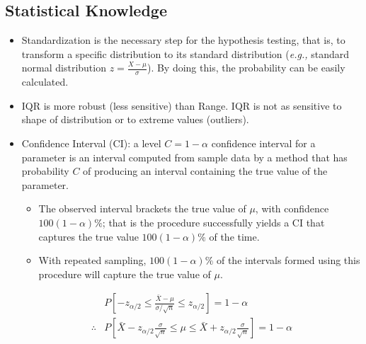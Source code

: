 \documentclass{article}
\begin{document}
\subsection{Statistical Knowledge}
\begin{itemize}
    \item Standardization is the necessary step for the hypothesis testing, that is, to transform a specific distribution to its standard distribution (\textit{e.g.,} standard normal distribution $z=\frac{X-\mu}{\sigma}$). By doing this, the probability can be easily calculated. 
    \item IQR is more robust (less sensitive) than Range. IQR is not as sensitive to shape of distribution or to extreme values (outliers).
    \item Confidence Interval (CI): a level $C=1-\alpha$ confidence interval for a parameter is an interval computed from sample data by a method that has probability $C$ of producing an interval containing the true value of the parameter.
        \begin{itemize}
            \item The observed interval brackets the true value of $\mu$, with confidence $100(1-\alpha)\%$; that is the procedure successfully yields a CI that captures the true value $100(1-\alpha)\%$ of the time. 
            \item With repeated sampling, $100(1-\alpha)\%$ of the intervals formed using this procedure will capture the true value of $\mu$.
        \end{itemize}
         \begin{align*}
                   &P[-z_{\alpha/2}\leq \frac{\bar{X}-\mu}{\sigma/\sqrt{n}}\leq z_{\alpha/2}]=1-\alpha \\
        \therefore &P[\bar{X}-z_{\alpha/2}\frac{\sigma}{\sqrt{n}}\leq \mu \leq \bar{X}+z_{\alpha/2}\frac{\sigma}{\sqrt{n}}]=1-\alpha
        \end{align*}
\end{itemize}



\end{document}
